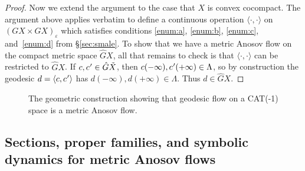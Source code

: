 \documentclass[11pt]{article}
\newcommand{\Subsection}{\subsection}
\let\epsilon\varepsilon
\newcommand{\cpr}{c\mkern1mu'}
\theoremstyle{definition}
\numberwithin{equation}{section}
\begin{document}
\begin{proof}
Now we extend the argument to the case that $X$ is convex cocompact. The argument above applies verbatim to define a continuous operation $\langle \cdot,\cdot \rangle $ on $(GX \times GX)_\epsilon$ which satisfies conditions \eqref{enum:a}, \eqref{enum:b}, \eqref{enum:c}, and~\eqref{enum:d} from \S \ref{sec:smale}. To show that we have a metric Anosov flow on the compact metric space $\hat GX$, all that remains to check is that $\langle \cdot,\cdot \rangle $ can be restricted to $\hat GX$. If $c, \cpr \in \hat G\tilde X$, then $c(-\infty), \cpr(+\infty) \in \Lambda$, so by construction the geodesic $d = \langle c, \cpr\rangle $ has $d(-\infty), d(+\infty) \in \Lambda$. Thus $d \in \hat GX$.
\end{proof}

\begin{figure}[htb]
\caption{The geometric construction showing that geodesic flow on a CAT(-1) space is a metric Anosov flow.}\label{fig:smale}
\end{figure}

\Subsection{Sections, proper families, and symbolic dynamics for metric Anosov flows}\label{sec:sections}
\end{document}
